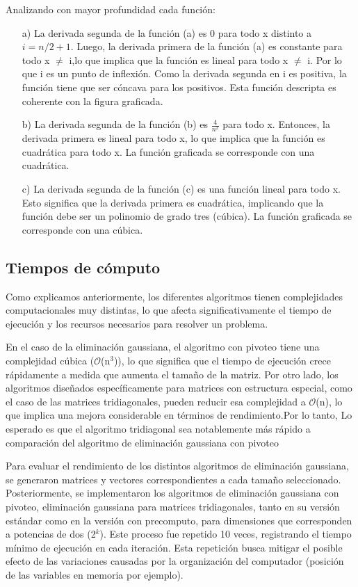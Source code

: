 Analizando con mayor profundidad cada función:\par
\begin{enumerate}
    \item[a)] La derivada segunda de la función (a) es 0 para todo x distinto a $i = n/2 + 1$. Luego, la derivada primera de la función (a) es constante para todo x $\not =$ i,lo que implica que la función es lineal para todo x $\not =$ i. Por lo que i es un punto de inflexión. Como la derivada segunda en i es positiva, la función tiene que ser cóncava para los positivos. Esta función descripta es coherente con la figura graficada.

    \item[b)] La derivada segunda de la función (b) es $\frac{4}{n^2}$ para todo x. Entonces, la derivada primera es lineal para todo x, lo que implica que la función es cuadrática para todo x. La función graficada se corresponde con una cuadrática.

    \item[c)] La derivada segunda de la función (c) es una función lineal para todo x. Esto significa que la derivada primera es cuadrática, implicando que la función debe ser un polinomio de grado tres (cúbica). La función graficada se corresponde con una cúbica.
\end{enumerate}



\subsection{Tiempos de cómputo}
Como explicamos anteriormente, los diferentes algoritmos tienen complejidades computacionales muy distintas, lo que afecta significativamente el tiempo de ejecución y los recursos necesarios para resolver un problema.

En el caso de la eliminación gaussiana, el algoritmo con pivoteo tiene una complejidad cúbica ($\mathcal{O}$(n$^3$)), lo que significa que el tiempo de ejecución crece rápidamente a medida que aumenta el tamaño de la matriz. Por otro lado, los algoritmos diseñados específicamente para matrices con estructura especial, como el caso de las matrices tridiagonales, pueden reducir esa complejidad a $\mathcal{O}$(n), lo que implica una mejora considerable en términos de rendimiento.Por lo tanto, Lo esperado es que el algoritmo tridiagonal sea notablemente más rápido a comparación del algoritmo de eliminación gaussiana con pivoteo

Para evaluar el rendimiento de los distintos algoritmos de eliminación gaussiana, se generaron matrices y vectores correspondientes a cada tamaño seleccionado. Posteriormente, se implementaron los algoritmos de eliminación gaussiana con pivoteo, eliminación gaussiana para matrices tridiagonales, tanto en su versión estándar como en la versión con precomputo, para dimensiones que corresponden a potencias de dos (2$^k$). Este proceso fue repetido 10 veces, registrando el tiempo mínimo de ejecución en cada iteración. Esta repetición busca mitigar el posible efecto de las variaciones causadas por la organización del computador (posición de las variables en memoria por ejemplo).

